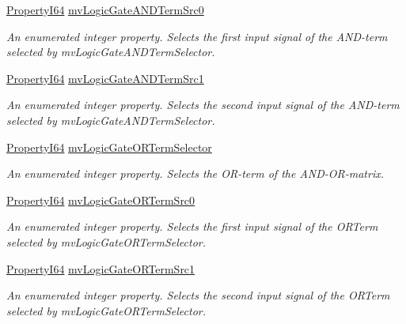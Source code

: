 \begin{DoxyCompactItemize}
\hyperlink{group___common_interface_ga81749b2696755513663492664a18a893}{Property\+I64} \hyperlink{classmv_i_m_p_a_c_t_1_1acquire_1_1_gen_i_cam_1_1mv_logic_gate_control_a71eefe30ae8aa7fc1f738becc8e5d529}{mv\+Logic\+Gate\+A\+N\+D\+Term\+Src0}
\begin{DoxyCompactList}\small\item\em An enumerated integer property. Selects the first input signal of the A\+N\+D-\/term selected by mv\+Logic\+Gate\+A\+N\+D\+Term\+Selector. \end{DoxyCompactList}\item 
\hyperlink{group___common_interface_ga81749b2696755513663492664a18a893}{Property\+I64} \hyperlink{classmv_i_m_p_a_c_t_1_1acquire_1_1_gen_i_cam_1_1mv_logic_gate_control_a4eb76d114a2504d40b571ab83c4e2b9d}{mv\+Logic\+Gate\+A\+N\+D\+Term\+Src1}
\begin{DoxyCompactList}\small\item\em An enumerated integer property. Selects the second input signal of the A\+N\+D-\/term selected by mv\+Logic\+Gate\+A\+N\+D\+Term\+Selector. \end{DoxyCompactList}\item 
\hyperlink{group___common_interface_ga81749b2696755513663492664a18a893}{Property\+I64} \hyperlink{classmv_i_m_p_a_c_t_1_1acquire_1_1_gen_i_cam_1_1mv_logic_gate_control_af26ef99b8f2eb5b478ea576e4ebd3c70}{mv\+Logic\+Gate\+O\+R\+Term\+Selector}
\begin{DoxyCompactList}\small\item\em An enumerated integer property. Selects the O\+R-\/term of the A\+N\+D-\/\+O\+R-\/matrix. \end{DoxyCompactList}\item 
\hyperlink{group___common_interface_ga81749b2696755513663492664a18a893}{Property\+I64} \hyperlink{classmv_i_m_p_a_c_t_1_1acquire_1_1_gen_i_cam_1_1mv_logic_gate_control_aedff5baffbe81054b6e2d043664d8bbb}{mv\+Logic\+Gate\+O\+R\+Term\+Src0}
\begin{DoxyCompactList}\small\item\em An enumerated integer property. Selects the first input signal of the O\+R\+Term selected by mv\+Logic\+Gate\+O\+R\+Term\+Selector. \end{DoxyCompactList}\item 
\hyperlink{group___common_interface_ga81749b2696755513663492664a18a893}{Property\+I64} \hyperlink{classmv_i_m_p_a_c_t_1_1acquire_1_1_gen_i_cam_1_1mv_logic_gate_control_acede1a2a2dc54878a67f52f25aec782b}{mv\+Logic\+Gate\+O\+R\+Term\+Src1}
\begin{DoxyCompactList}\small\item\em An enumerated integer property. Selects the second input signal of the O\+R\+Term selected by mv\+Logic\+Gate\+O\+R\+Term\+Selector. \end{DoxyCompactList}\end{DoxyCompactItemize}
